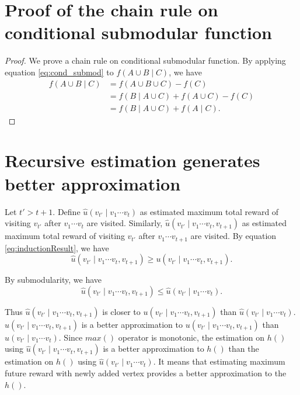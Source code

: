 \section{Proof of the chain rule on conditional submodular function}
\label{app:cond_submod_chain_rule}
\begin{proof}

We prove a chain rule on conditional submodular function.
By applying equation \eqref{eq:cond_submod} to $ f( A \cup B \mid C ) $, we have
\begin{equation}
\label{eq:cond_submod_chain_rule}
\begin{aligned}
f( A \cup B \mid C ) & = f( A \cup B \cup C ) - f( C ) \\
& = f( B \mid A \cup C ) + f( A \cup C ) - f( C ) \\
& = f( B \mid A \cup C ) + f( A \mid C).
\end{aligned}
\end{equation} 

\end{proof}

\section{Recursive estimation generates better approximation}
\label{app:better_approximation}
Let $ t' > t + 1 $.
Define $ \hat{u}(v_{t'} \mid v_{1} \cdots v_{t}) $ as estimated maximum total reward of visiting $ v_{t'} $ after $ v_{1} \cdots v_{t} $ are visited.
Similarly, $ \hat{u}(v_{t'} \mid v_{1} \cdots v_{t}, v_{t+1}) $ as estimated maximum total reward of visiting $ v_{t'} $ after $ v_{1} \cdots v_{t+1} $ are visited.
By equation \eqref{eq:inductionResult}, we have 
\begin{equation}
\hat{u}(v_{t'} \mid v_{1} \cdots v_{t}, v_{t+1}) \geq u(v_{t'} \mid v_{1} \cdots v_{t}, v_{t+1}).
\end{equation}

By submodularity, we have
\begin{equation}
\hat{u}(v_{t'} \mid v_{1} \cdots v_{t}, v_{t+1}) \leq \hat{u}(v_{t'} \mid v_{1} \cdots v_{t}).
\end{equation}

Thus $ \hat{u}(v_{t'} \mid v_{1} \cdots v_{t}, v_{t+1}) $ is closer to $ u(v_{t'} \mid v_{1} \cdots v_{t}, v_{t+1}) $ than $ \hat{u}(v_{t'} \mid v_{1} \cdots v_{t}) $.
$ \hat{u}(v_{t'} \mid v_{1} \cdots v_{t}, v_{t+1}) $ is a better approximation to $ u(v_{t'} \mid v_{1} \cdots v_{t}, v_{t+1}) $ than $ \hat{u}(v_{t'} \mid v_{1} \cdots v_{t}) $.
Since $ max() $ operator is monotonic, the estimation on $ h() $ using $ \hat{u}(v_{t'} \mid v_{1} \cdots v_{t}, v_{t+1}) $  is a better approximation to $ h() $ than the estimation on $ h() $ using $ \hat{u}(v_{t'} \mid v_{1} \cdots v_{t}) $.
It means that estimating maximum future reward with newly added vertex provides a better approximation to the $ h() $.

